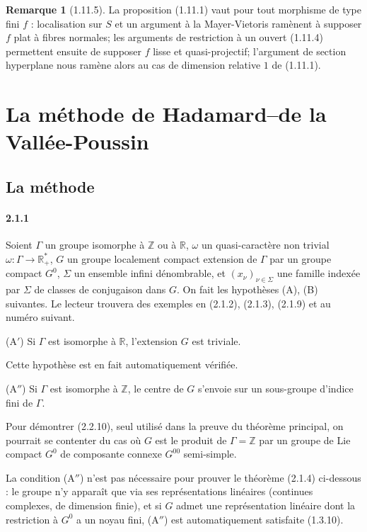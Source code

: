 \documentclass[12pt,a4paper]{article}
\theoremstyle{plain}
\theoremstyle{definition}
\newtheorem{remark}[theorem]{Remarque}
\theoremstyle{remark}
\newcommand{\RR}{{\mathbb{R}}}
\newcommand{\ZZ}{{\mathbb{Z}}}
\begin{document}
\begin{remark}[1.11.5]
La proposition (1.11.1) vaut pour tout morphisme de type fini $f$ : localisation sur $S$ et un argument \`a la Mayer-Vietoris ram\`enent \`a supposer $f$ plat \`a fibres normales; les arguments de restriction \`a un ouvert (1.11.4) permettent ensuite de supposer $f$ lisse et quasi-projectif; l'argument de section hyperplane nous ram\`ene alors au cas de dimension relative $1$ de (1.11.1).
\end{remark}


\newpage
\section{La m\'ethode de Hadamard--de la Vall\'ee-Poussin}

\subsection{La m\'ethode}

\paragraph{2.1.1}
Soient $\Gamma$ un groupe isomorphe \`a $\ZZ$ ou \`a $\RR$, $\omega$ un quasi-caract\`ere non trivial $\omega : \Gamma \to \RR_{+}^*$, $G$ un groupe localement compact extension de $\Gamma$ par un groupe compact $G^0$, $\Sigma$ un ensemble infini d\'enombrable, et $(x_\nu)_{\nu \in \Sigma}$ une famille index\'ee par $\Sigma$ de classes de conjugaison dans $G$. On fait les hypoth\`eses (A), (B) suivantes. Le lecteur trouvera des exemples en (2.1.2), (2.1.3), (2.1.9) et au num\'ero suivant.

(A$'$) Si $\Gamma$ est isomorphe \`a $\RR$, l'extension $G$ est triviale.

Cette hypoth\`ese est en fait automatiquement v\'erifi\'ee.

(A$''$) Si $\Gamma$ est isomorphe \`a $\ZZ$, le centre de $G$ s'envoie sur un sous-groupe d'indice fini de $\Gamma$.

Pour d\'emontrer (2.2.10), seul utilis\'e dans la preuve du th\'eor\`eme principal, on pourrait se contenter du cas o\`u $G$ est le produit de $\Gamma = \ZZ$ par un groupe de Lie compact $G^0$ de composante connexe $G^{00}$ semi-simple.

La condition (A$''$) n'est pas n\'ecessaire pour prouver le th\'eor\`eme (2.1.4) ci-dessous : le groupe n'y appara\^it que via ses repr\'esentations lin\'eaires (continues complexes, de dimension finie), et si $G$ admet une repr\'esentation lin\'eaire dont la restriction \`a $G^0$ a un noyau fini, (A$''$) est automatiquement satisfaite (1.3.10).
\end{document}
